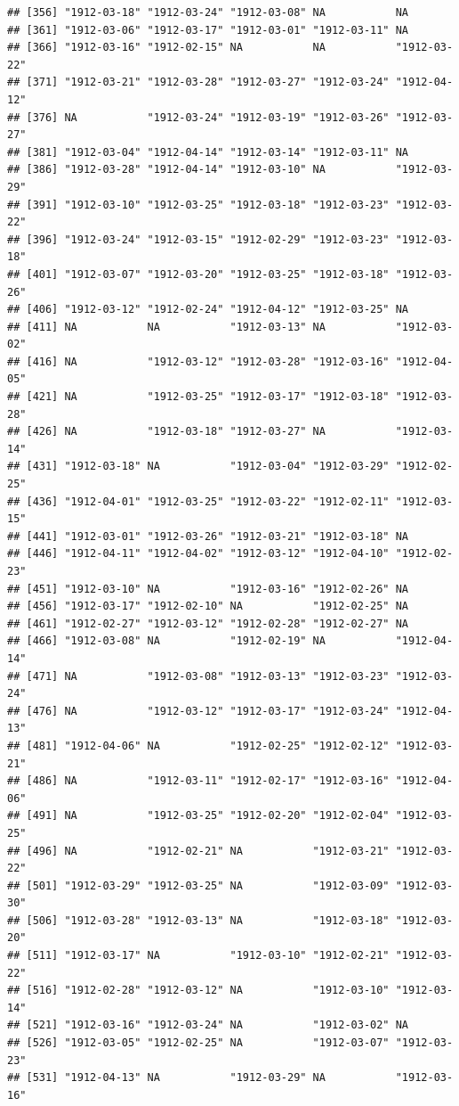 \documentclass[11pt,]{book}
\begin{document}
\begin{verbatim}
## [356] "1912-03-18" "1912-03-24" "1912-03-08" NA           NA          
## [361] "1912-03-06" "1912-03-17" "1912-03-01" "1912-03-11" NA          
## [366] "1912-03-16" "1912-02-15" NA           NA           "1912-03-22"
## [371] "1912-03-21" "1912-03-28" "1912-03-27" "1912-03-24" "1912-04-12"
## [376] NA           "1912-03-24" "1912-03-19" "1912-03-26" "1912-03-27"
## [381] "1912-03-04" "1912-04-14" "1912-03-14" "1912-03-11" NA          
## [386] "1912-03-28" "1912-04-14" "1912-03-10" NA           "1912-03-29"
## [391] "1912-03-10" "1912-03-25" "1912-03-18" "1912-03-23" "1912-03-22"
## [396] "1912-03-24" "1912-03-15" "1912-02-29" "1912-03-23" "1912-03-18"
## [401] "1912-03-07" "1912-03-20" "1912-03-25" "1912-03-18" "1912-03-26"
## [406] "1912-03-12" "1912-02-24" "1912-04-12" "1912-03-25" NA          
## [411] NA           NA           "1912-03-13" NA           "1912-03-02"
## [416] NA           "1912-03-12" "1912-03-28" "1912-03-16" "1912-04-05"
## [421] NA           "1912-03-25" "1912-03-17" "1912-03-18" "1912-03-28"
## [426] NA           "1912-03-18" "1912-03-27" NA           "1912-03-14"
## [431] "1912-03-18" NA           "1912-03-04" "1912-03-29" "1912-02-25"
## [436] "1912-04-01" "1912-03-25" "1912-03-22" "1912-02-11" "1912-03-15"
## [441] "1912-03-01" "1912-03-26" "1912-03-21" "1912-03-18" NA          
## [446] "1912-04-11" "1912-04-02" "1912-03-12" "1912-04-10" "1912-02-23"
## [451] "1912-03-10" NA           "1912-03-16" "1912-02-26" NA          
## [456] "1912-03-17" "1912-02-10" NA           "1912-02-25" NA          
## [461] "1912-02-27" "1912-03-12" "1912-02-28" "1912-02-27" NA          
## [466] "1912-03-08" NA           "1912-02-19" NA           "1912-04-14"
## [471] NA           "1912-03-08" "1912-03-13" "1912-03-23" "1912-03-24"
## [476] NA           "1912-03-12" "1912-03-17" "1912-03-24" "1912-04-13"
## [481] "1912-04-06" NA           "1912-02-25" "1912-02-12" "1912-03-21"
## [486] NA           "1912-03-11" "1912-02-17" "1912-03-16" "1912-04-06"
## [491] NA           "1912-03-25" "1912-02-20" "1912-02-04" "1912-03-25"
## [496] NA           "1912-02-21" NA           "1912-03-21" "1912-03-22"
## [501] "1912-03-29" "1912-03-25" NA           "1912-03-09" "1912-03-30"
## [506] "1912-03-28" "1912-03-13" NA           "1912-03-18" "1912-03-20"
## [511] "1912-03-17" NA           "1912-03-10" "1912-02-21" "1912-03-22"
## [516] "1912-02-28" "1912-03-12" NA           "1912-03-10" "1912-03-14"
## [521] "1912-03-16" "1912-03-24" NA           "1912-03-02" NA          
## [526] "1912-03-05" "1912-02-25" NA           "1912-03-07" "1912-03-23"
## [531] "1912-04-13" NA           "1912-03-29" NA           "1912-03-16"

\end{verbatim}
\end{document}
